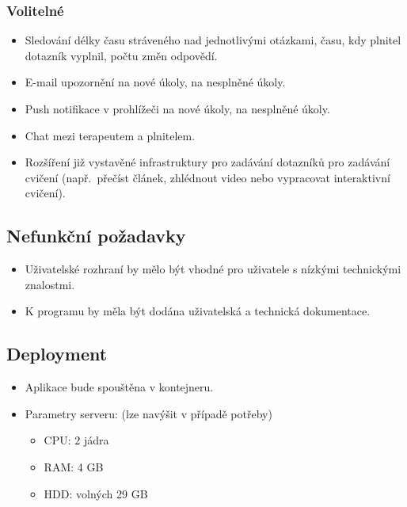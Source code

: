 \subsubsection{Volitelné}

\begin{itemize}
\item
Sledování délky času stráveného nad jednotlivými otázkami, času, kdy plnitel dotazník vyplnil, počtu změn odpovědí.
\item
  E-mail upozornění na nové úkoly, na nesplněné úkoly.
\item
  Push notifikace v prohlížeči na nové úkoly, na nesplněné úkoly.
\item
Chat mezi terapeutem a plnitelem.
\item
  Rozšíření již vystavěné infrastruktury pro zadávání dotazníků pro zadávání cvičení (např.\ přečíst článek, zhlédnout video nebo vypracovat interaktivní cvičení).
\end{itemize}


\subsection{Nefunkční požadavky}\label{subsec:nefunkcni-pozadavky}

\begin{itemize}
\item
Uživatelské rozhraní by mělo být vhodné pro uživatele s nízkými technickými znalostmi.
\item
  K programu by měla být dodána uživatelská a technická dokumentace.
\end{itemize}


\subsection{Deployment}\label{subsec:deployment}

\begin{itemize}
\item
  Aplikace bude spouštěna v kontejneru.
\item
  Parametry serveru: (lze navýšit v případě potřeby)

  \begin{itemize}
  \item
    CPU: 2 jádra
  \item
    RAM: 4 GB
  \item
    HDD: volných 29 GB
  \end{itemize}
\end{itemize}


